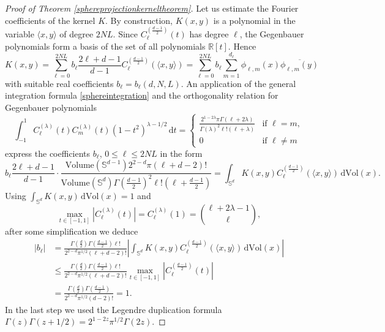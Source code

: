 \documentclass[11pt,a4paper]{article}
\theoremstyle{definition}
\begin{document}
\begin{proof}[Proof of Theorem \ref{sphereprojectionkerneltheorem}]
Let us estimate the Fourier coefficients of the kernel $K$. By construction, $K(x,y)$ is a polynomial in the variable $\langle x,y \rangle$ of degree $2NL$. Since $C_{\ell}^{(\frac{d-1}{2})}(t)$ has degree $\ell$, the Gegenbauer polynomials form a basis of the set of all polynomials $\mathbb{R}[t]$. Hence
\begin{equation}\label{kernelfourierexpansion}
K(x,y) = \sum_{\ell=0}^{2NL} b_{\ell} \frac{2\ell +d-1}{d-1} C_{\ell}^{(\frac{d-1}{2})}(\langle x,y \rangle) = \sum_{\ell=0}^{2NL} b_{\ell} \sum_{m=1}^{d_{\ell}} \phi_{\ell,m}(x) \overline{\phi_{\ell,m}(y)}
\end{equation}
with suitable real coefficients $b_{\ell}=b_{\ell}(d,N,L)$. An application of the general integration formula \eqref{sphereintegration} and the orthogonality relation for Gegenbauer polynomials \cite[p.\ 81]{SZ}
\begin{equation}\label{gegenbauerorthogonality}
\int_{-1}^1 C_{\ell}^{(\lambda)}(t) C_m^{(\lambda)}(t) (1-t^2)^{\lambda-1/2} \, \mathrm{d}t = \left\{ \begin{array}{ll} \displaystyle{\frac{2^{1-2\lambda} \pi \Gamma (\ell+2\lambda)}{\Gamma (\lambda)^2 \ell! (\ell+\lambda)}} & \textrm{if } \ell=m, \\ 0 & \textrm{if } \ell \neq m \end{array} \right.
\end{equation}
express the coefficients $b_{\ell}$, $0 \le \ell \le 2NL$ in the form
\[ b_{\ell} \frac{2\ell +d-1}{d-1} \cdot \frac{\mathrm{Volume}(\mathbb{S}^{d-1}) 2^{2-d} \pi (\ell+d-2)!}{\mathrm{Volume}(\mathbb{S}^d) \Gamma \left( \frac{d-1}{2} \right)^2 \ell! \left( \ell +\frac{d-1}{2} \right)} = \int_{\mathbb{S}^d} K(x,y) C_{\ell}^{(\frac{d-1}{2})}(\langle x,y \rangle) \, \mathrm{d} \mathrm{Vol}(x) . \]
Using $\int_{\mathbb{S}^d} K(x,y) \, \mathrm{d}\mathrm{Vol}(x)=1$ and \cite[p.\ 171, Theorem 7.33.1]{SZ}
\begin{equation}\label{gegenbauersupremum}
\max_{t \in [-1,1]} |C_{\ell}^{(\lambda)}(t)| = C_{\ell}^{(\lambda)}(1) = \binom{\ell+2\lambda-1}{\ell},
\end{equation}
after some simplification we deduce
\begin{equation}\label{bellbound}
\begin{split} |b_{\ell}| &= \frac{\Gamma \left( \frac{d}{2} \right) \Gamma \left( \frac{d-1}{2} \right) \ell !}{2^{2-d} \pi^{1/2} (\ell+d-2)!} \left| \int_{\mathbb{S}^d} K(x,y) C_{\ell}^{(\frac{d-1}{2})}(\langle x,y \rangle) \, \mathrm{d}\mathrm{Vol}(x) \right| \\ &\le \frac{\Gamma \left( \frac{d}{2} \right) \Gamma \left( \frac{d-1}{2} \right) \ell !}{2^{2-d} \pi^{1/2} (\ell+d-2)!} \max_{t \in [-1,1]} |C_{\ell}^{(\frac{d-1}{2})}(t)| \\ &= \frac{\Gamma \left( \frac{d}{2} \right) \Gamma \left( \frac{d-1}{2} \right)}{2^{2-d} \pi^{1/2} (d-2)!} =1 . \end{split}
\end{equation}
In the last step we used the Legendre duplication formula $\Gamma (z) \Gamma (z+1/2) = 2^{1-2z} \pi^{1/2} \Gamma (2z)$.


\end{proof}
\end{document}
